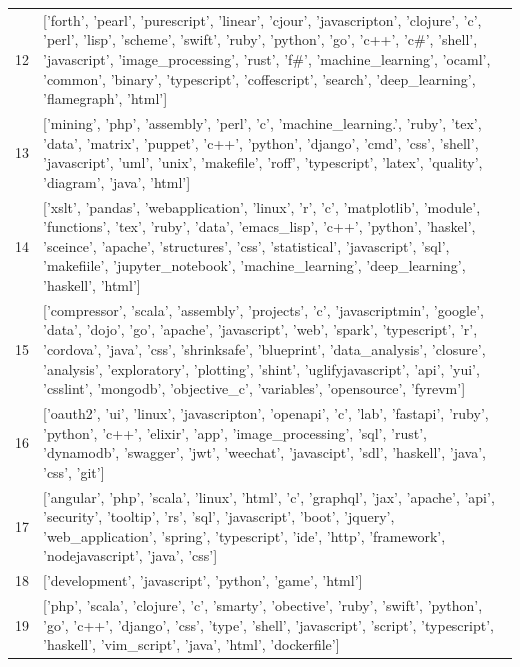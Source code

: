 \begin{center}
\begin{longtable}{|p{1.5cm}|p{12.5cm}|}
            12 & ['forth', 'pearl', 'purescript', 'linear', 'cjour', 'javascripton', 'clojure', 'c', 'perl', 'lisp', 'scheme', 'swift', 'ruby', 'python', 'go', 'c++', 'c\#', 'shell', 'javascript', 'image\_processing', 'rust', 'f\#', 'machine\_learning', 'ocaml', 'common', 'binary', 'typescript', 'coffescript', 'search', 'deep\_learning', 'flamegraph', 'html']  \\ 
            13 & ['mining', 'php', 'assembly', 'perl', 'c', 'machine\_learning.', 'ruby', 'tex', 'data', 'matrix', 'puppet', 'c++', 'python', 'django', 'cmd', 'css', 'shell', 'javascript', 'uml', 'unix', 'makefile', 'roff', 'typescript', 'latex', 'quality', 'diagram', 'java', 'html']  \\ 
            14 & ['xslt', 'pandas', 'webapplication', 'linux', 'r', 'c', 'matplotlib', 'module', 'functions', 'tex', 'ruby', 'data', 'emacs\_lisp', 'c++', 'python', 'haskel', 'sceince', 'apache', 'structures', 'css', 'statistical', 'javascript', 'sql', 'makefiile', 'jupyter\_notebook', 'machine\_learning', 'deep\_learning', 'haskell', 'html']  \\ 
            15 & ['compressor', 'scala', 'assembly', 'projects', 'c', 'javascriptmin', 'google', 'data', 'dojo', 'go', 'apache', 'javascript', 'web', 'spark', 'typescript', 'r', 'cordova', 'java', 'css', 'shrinksafe', 'blueprint', 'data\_analysis', 'closure', 'analysis', 'exploratory', 'plotting', 'shint', 'uglifyjavascript', 'api', 'yui', 'csslint', 'mongodb', 'objective\_c', 'variables', 'opensource', 'fyrevm']  \\ 
            16 & ['oauth2', 'ui', 'linux', 'javascripton', 'openapi', 'c', 'lab', 'fastapi', 'ruby', 'python', 'c++', 'elixir', 'app', 'image\_processing', 'sql', 'rust', 'dynamodb', 'swagger', 'jwt', 'weechat', 'javascipt', 'sdl', 'haskell', 'java', 'css', 'git']  \\ 
            17 & ['angular', 'php', 'scala', 'linux', 'html', 'c', 'graphql', 'jax', 'apache', 'api', 'security', 'tooltip', 'rs', 'sql', 'javascript', 'boot', 'jquery', 'web\_application', 'spring', 'typescript', 'ide', 'http', 'framework', 'nodejavascript', 'java', 'css']  \\ 
            18 & ['development', 'javascript', 'python', 'game', 'html']  \\ 
            19 & ['php', 'scala', 'clojure', 'c', 'smarty', 'obective', 'ruby', 'swift', 'python', 'go', 'c++', 'django', 'css', 'type', 'shell', 'javascript', 'script', 'typescript', 'haskell', 'vim\_script', 'java', 'html', 'dockerfile']  \\ 

\end{longtable}
\end{center}
